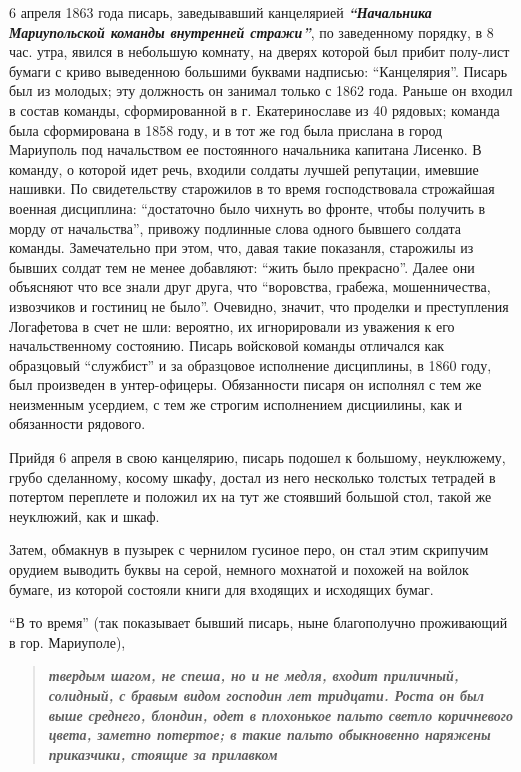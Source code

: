 \documentclass[a4paper,20pt]{report}
\begin{document}
6 апреля 1863 года писарь, заведывавший канцелярией 
\textbf{\em ``Начальника Мариупольской команды внутренней стражи''},
по заведенному порядку, в 8 час. утра, явился в небольшую комнату, на дверях которой был прибит полу-лист
бумаги с криво выведенною большими буквами надписью: ``Канцелярия''. Писарь был из молодых; эту должность он занимал только с 1862 года.
Раньше он входил в состав команды, сформированной в г. Екатеринославе из 40 рядовых; команда была сформирована в 1858 году, и в тот же год была прислана в город Мариуполь под начальством ее постоянного начальника капитана Лисенко. 
В команду, о которой идет речь, входили солдаты лучшей репутации, имевшие нашивки. По свидетельству старожилов
в то время господствовала строжайшая военная
дисциплина: ``достаточно было чихнуть во фронте, чтобы
получить в морду от начальства'', привожу подлинные
слова одного бывшего солдата команды. Замечательно при
этом, что, давая такие показанля, старожилы из бывших
солдат тем не менее добавляют: ``жить было прекрасно''.
Далее они объясняют что все знали друг друга, что 
``воровства, грабежа, мошенничества, извозчиков и гостиниц
не было''. Очевидно, значит, что проделки и преступления Логафетова в счет не шли: вероятно, их
игнорировали из уважения к его начальственному состоянию.
Писарь войсковой команды отличался как образцовый ``службист'' и за образцовое
исполнение дисциплины, в 1860 году, был произведен в унтер-офицеры. Обязанности
писаря он исполнял с тем же неизменным усердием, с тем же строгим исполнением
дисциилины, как и обязанности рядового.

Прийдя 6 апреля в свою канцелярию, писарь подошел к большому, неуклюжему, грубо сделанному,
косому шкафу, достал из него несколько толстых тетрадей в потертом переплете и положил их на тут же
стоявший большой стол, такой же неуклюжий, как и шкаф.

Затем, обмакнув в пузырек с чернилом гусиное перо, он стал этим скрипучим
орудием выводить буквы на серой, немного мохнатой и похожей на войлок бумаге,
из которой состояли книги для входящих и исходящих бумаг.

``В то время'' (так показывает бывший писарь, ныне благополучно проживающий в гор. Мариуполе), 
\begin{quote}
\bfseries\em
твердым шагом, не спеша, но и не медля, входит приличный, 
солидный, с бравым видом господин лет тридцати. Роста он был выше среднего, блондин, одет в плохонькое пальто
светло коричневого цвета, заметно потертое; в такие пальто обыкновенно наряжены приказчики, стоящие за прилавком
\end{quote}
\end{document}
